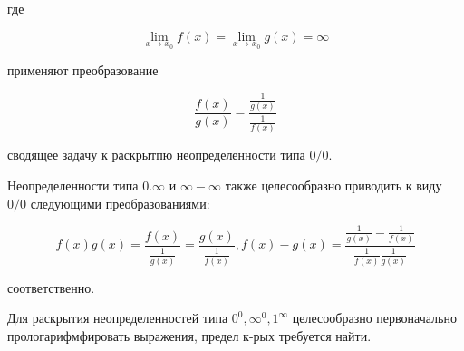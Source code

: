 \documentclass[10pt]{article}
\begin{document}
где



\[

\lim _{x \rightarrow x_{0}} f(x)=\lim _{x \rightarrow x_{0}} g(x)=\infty

\]



применяют преобразование



\[

\frac{f(x)}{g(x)}=\frac{\frac{1}{g(x)}}{\frac{1}{f(x)}}

\]



сводящее задачу к раскрытпю неопределенности типа $0 / 0$.



Неопределенности типа $0 . \infty$ и $\infty-\infty$ также целесообразно приводить к виду $0 / 0$ следующими преобразованиями:



\[

f(x) g(x)=\frac{f(x)}{\frac{1}{g(x)}}=\frac{g(x)}{\frac{1}{f(x)}}, f(x)-g(x)=\frac{\frac{1}{g(x)}-\frac{1}{f(x)}}{\frac{1}{f(x)} \frac{1}{g(x)}}

\]



соответственно.



Для раскрытия неопределенностей типа $0^{0}, \infty^{0}, 1^{\infty}$ целесообразно первоначально прологарифмфировать выражения, предел к-рых требуется найти.
\end{document}
